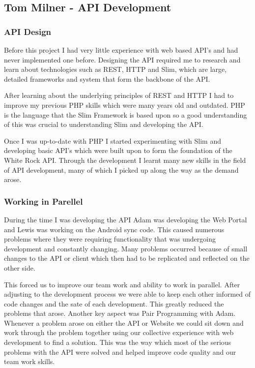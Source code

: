 \documentclass[11pt,a4paper]{report}
\begin{document}
\subsection{Tom Milner - API Development}

\subsubsection{API Design}
Before this project I had very little experience with web based API's and had never implemented one before. Designing the API required me to research and learn about technologies such as REST, HTTP and Slim, which are large, detailed frameworks and system that form the backbone of the API.

After learning about the underlying principles of REST and HTTP I had to improve my previous PHP skills which were many years old and outdated. PHP is the language that the Slim Framework is based upon so a good understanding of this was crucial to understanding Slim and developing the API.

Once I was up-to-date with PHP I started experimenting with Slim and developing basic API's which were built upon to form the foundation of the White Rock API. Through the development I learnt many new skills in the field of API development, many of which I picked up along the way as the demand arose.

\subsubsection{Working in Parellel} 
During the time I was developing the API Adam was developing the Web Portal and Lewis was working on the Android sync code. This caused numerous problems where they were requiring functionality that was undergoing development and constantly changing. Many problems occurred because of small changes to the API or client which then had to be replicated and reflected on the other side. 

This forced us to improve our team work and ability to work in parallel. After adjusting to the development process we were able to keep each other informed of code changes and the sate of each development. This greatly reduced the problems that arose. Another key aspect was Pair Programming with Adam. Whenever a problem arose on either the API or Website we could sit down and work through the problem together using our collective experience with web development to find a solution. This was the way which most of the serious problems with the API were solved and helped improve code quality and our team work skills.
\end{document}
